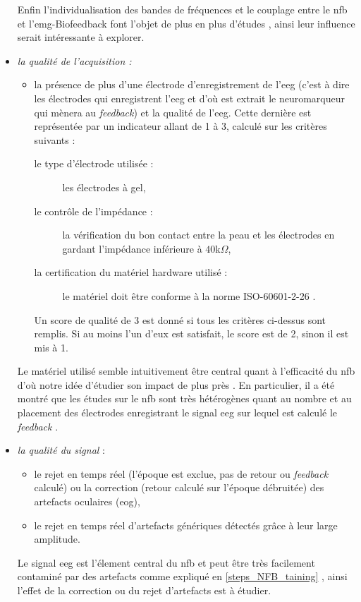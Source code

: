 \begin{itemize}
Enfin l'individualisation des bandes de fréquences et le couplage entre le \gls{nfb} et l'\gls{emg}-Biofeedback font l'objet de plus en plus d'études \citep{Bioulac2019, Bazanova2018, Bink2014,
Duric2012, Enriquez2017, Klimesch1999}, ainsi leur influence serait intéressante à explorer. 
\item \emph{la qualité de l'acquisition :} 
    \begin{itemize}
    \item la présence de plus d'une électrode d'enregistrement de l'\gls{eeg} (c'est à dire les électrodes qui enregistrent l'\gls{eeg} et d'où 
		est extrait le neuromarqueur qui mènera au \textit{feedback}) et la qualité de 
		l'\gls{eeg}. Cette dernière est représentée par un indicateur allant de 1 à 3, calculé sur les critères suivants : 
        \begin{description} 
        \item[le type d'électrode utilisée :] les électrodes à gel,
        \item[le contrôle de l'impédance :] la vérification du bon contact entre la peau et les électrodes en gardant l'impédance inférieure à $40$k$\Omega$,
        \item[la certification du matériel hardware utilisé :] le matériel doit être conforme à la norme ISO-60601-2-26 \citep{ISO}.
        \end{description}
    Un score de qualité de 3 est donné si tous les critères ci-dessus sont remplis. Si au moins l'un d'eux est satisfait, le score est de 2, sinon il est mis à 1.
		\end{itemize}
Le matériel utilisé semble intuitivement être central quant à l'efficacité du \gls{nfb} d'où notre idée d'étudier son impact de plus près \citep{Lopez2014}. En particulier,
il a été montré que les études sur le \gls{nfb} sont très hétérogènes quant au nombre et au placement des électrodes enregistrant le signal \gls{eeg} sur 
lequel est calculé le \textit{feedback} \citep{Enriquez2017, Rogala2016}.
\item \emph{la qualité du signal} : 
    \begin{itemize}
    \item le rejet en temps réel (l'époque est exclue, pas de retour ou \emph{feedback} calculé) ou la correction (retour calculé sur l'époque débruitée) des 
artefacts oculaires (\gls{eog}),
    \item le rejet en temps réel d'artefacts génériques détectés grâce à leur large amplitude. 
    \end{itemize}
Le signal \gls{eeg} est l'élement central du \gls{nfb} et peut être très facilement contaminé par des artefacts comme expliqué en \ref{steps_NFB_taining} \citep{Chavez2018}, 
ainsi l'effet de la correction ou du rejet 
d'artefacts est à étudier. 
\end{itemize}

